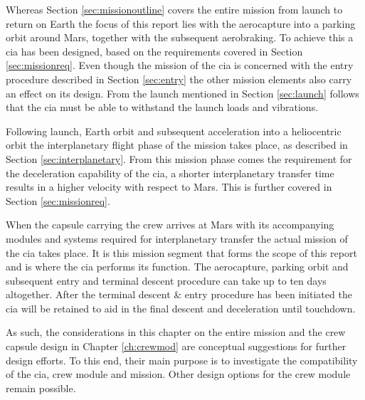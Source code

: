 Whereas Section \ref{sec:missionoutline} covers the entire mission from launch to return on Earth the focus of this report lies with the aerocapture into a parking orbit around Mars, together with the subsequent aerobraking. To achieve this a \gls{cia} has been designed, based on the requirements covered in Section \ref{sec:missionreq}. Even though the mission of the \gls{cia} is concerned with the entry procedure described in Section \ref{sec:entry} the other mission elements also carry an effect on its design. From the launch mentioned in Section \ref{sec:launch} follows that the \gls{cia} must be able to withstand the launch loads and vibrations. 

Following launch, Earth orbit and subsequent acceleration into a heliocentric orbit the interplanetary flight phase of the mission takes place, as described in Section \ref{sec:interplanetary}. From this mission phase comes the requirement for the deceleration capability of the \gls{cia}, a shorter interplanetary transfer time results in a higher velocity with respect to Mars. This is further covered in Section \ref{sec:missionreq}. 

When the capsule carrying the crew arrives at Mars with its accompanying modules and systems required for interplanetary transfer the actual mission of the \gls{cia} takes place. It is this mission segment that forms the scope of this report and is where the \gls{cia} performs its function. The aerocapture, parking orbit and subsequent entry and terminal descent procedure can take up to ten days altogether. After the terminal descent \& entry procedure has been initiated the \gls{cia} will be retained to aid in the final descent and deceleration until touchdown.

As such, the considerations in this chapter on the entire mission and the crew capsule design in Chapter \ref{ch:crewmod} are conceptual suggestions for further design efforts. To this end, their main purpose is to investigate the compatibility of the \gls{cia}, crew module and mission. Other design options for the crew module remain possible.
